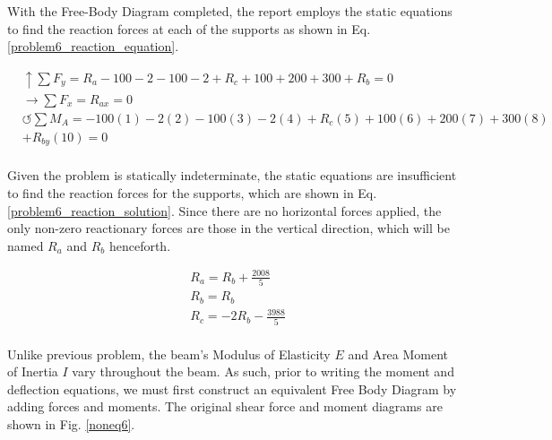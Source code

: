 \documentclass[a4paper]{article}
\begin{document}
With the Free-Body Diagram completed, the report employs the static equations to find the reaction forces at each of the supports as shown in Eq. \ref{problem6_reaction_equation}.

\begin{equation}
\begin{split}
	&\uparrow \sum F_y = R_a - 100 - 2 - 100 -2 + R_c + 100 + 200 + 300 + R_b = 0 \\
 	&\rightarrow \sum F_x = R_{ax} = 0 \\
 	&\circlearrowleft \sum M_A = -100(1) - 2(2) -100(3) - 2(4) + R_c(5) +100(6) + 200(7) + 300(8) \\
	& + R_{by}(10) = 0\\
\end{split}
\label{problem6_reaction_equation}
\end{equation}

Given the problem is statically indeterminate, the static equations are insufficient to find the reaction forces for the supports, which are shown in Eq. \ref{problem6_reaction_solution}. Since there are no horizontal forces applied, the only non-zero reactionary forces are those in the vertical direction, which will be named $R_a$ and $R_b$ henceforth.

\begin{equation}
\begin{split}
	& R_a = R_b + \frac{2008}{5} \\
    	& R_b = R_b \\
    	& R_c = -2R_b -\frac{3988}{5} \\
\end{split}
\label{problem6_reaction_solution}
\end{equation}

Unlike previous problem, the beam's Modulus of Elasticity $E$ and Area Moment of Inertia $I$ vary throughout the beam. As such, prior to writing the moment and deflection equations, we must first construct an equivalent Free Body Diagram by adding forces and moments. The original shear force and moment diagrams are shown in Fig. \ref{noneq6}.
\end{document}
